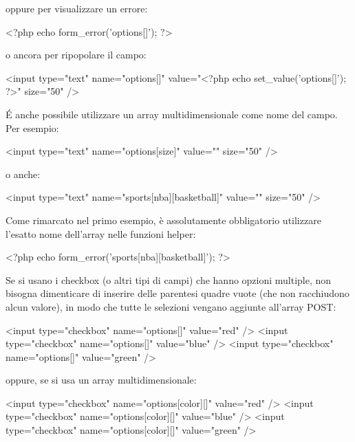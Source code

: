 
oppure per visualizzare un errore:

\begin{code}
<?php echo form_error('options[]'); ?>
\end{code}

o ancora per ripopolare il campo:

\begin{code}
<input type="text" name="options[]" value="<?php echo set_value('options[]'); ?>" size="50" />
\end{code}

\'E anche possibile utilizzare un array multidimensionale come nome del campo. Per esempio:

\begin{code}
<input type="text" name="options[size]" value="" size="50" />
\end{code}

o anche:

\begin{code}
<input type="text" name="sports[nba][basketball]" value="" size="50" />
\end{code}

Come rimarcato nel primo esempio, è assolutamente obbligatorio utilizzare l'esatto nome dell'array nelle funzioni helper:

\begin{code}
<?php echo form_error('sports[nba][basketball]'); ?>
\end{code}

Se si usano i checkbox (o altri tipi di campi) che hanno opzioni multiple, non bisogna dimenticare di inserire delle parentesi quadre vuote (che non racchiudono alcun valore), in modo che tutte le selezioni vengano aggiunte all'array POST:

\begin{code}
<input type="checkbox" name="options[]" value="red" />
<input type="checkbox" name="options[]" value="blue" />
<input type="checkbox" name="options[]" value="green" />
\end{code}

oppure, se si usa un array multidimensionale:

\begin{code}
<input type="checkbox" name="options[color][]" value="red" />
<input type="checkbox" name="options[color][]" value="blue" />
<input type="checkbox" name="options[color][]" value="green" />
\end{code}

